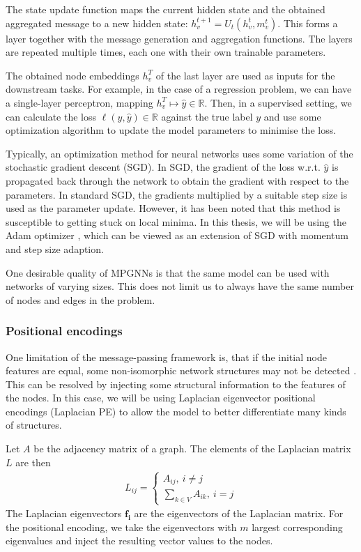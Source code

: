 \documentclass[english, 12pt, a4paper, sci, utf8, a-2b, online]{aaltothesis}
\newcommand{\R}{\mathbb{R}}
\begin{document}
The state update function maps the current hidden state and the obtained aggregated message to a new hidden state: $h_v^{t+1} = U_t(h_v^t, m_v^t)$. This forms a layer together with the message generation and aggregation functions. The layers are repeated multiple times, each one with their own trainable parameters.

The obtained node embeddings $h_v^T$ of the last layer are used as inputs for the downstream tasks. For example, in the case of a regression problem, we can have a single-layer perceptron, mapping $h_v^T \mapsto \hat{y} \in \R$. Then, in a supervised setting, we can calculate the loss $\ell(y, \hat{y}) \in \R$ against the true label $y$ and use some optimization algorithm to update the model parameters to minimise the loss.

Typically, an optimization method for neural networks uses some variation of the stochastic gradient descent (SGD). In SGD, the gradient of the loss w.r.t. $\hat{y}$ is propagated back through the network to obtain the gradient with respect to the parameters. In standard SGD, the gradients multiplied by a suitable step size is used as the parameter update. However, it has been noted that this method is susceptible to getting stuck on local minima. In this thesis, we will be using the Adam optimizer \cite{adam-2014}, which can be viewed as an extension of SGD with momentum and step size adaption.

One desirable quality of MPGNNs is that the same model can be used with networks of varying sizes. This does not limit us to always have the same number of nodes and edges in the problem.



\subsubsection{Positional encodings}

One limitation of the message-passing framework is, that if the initial node features are equal, some non-isomorphic network structures may not be detected \cite{repr-limit-2020}. This can be resolved by injecting some structural information to the features of the nodes. In this case, we will be using Laplacian eigenvector positional encodings (Laplacian PE) \cite{LaPE-first-introduction-2003} to allow the model to better differentiate many kinds of structures.

Let $A$ be the adjacency matrix of a graph. The elements of the Laplacian matrix $L$ are then
\begin{align}
    L_{ij} = \begin{cases}
        A_{ij},\ i \neq j\\
        \sum_{k \in V} A_{ik},\ i = j
    \end{cases}
\end{align}
The Laplacian eigenvectors $\mathbf{f_i}$ are the eigenvectors of the Laplacian matrix. For the positional encoding, we take the eigenvectors with $m$ largest corresponding eigenvalues and inject the resulting vector values to the nodes.
\end{document}
